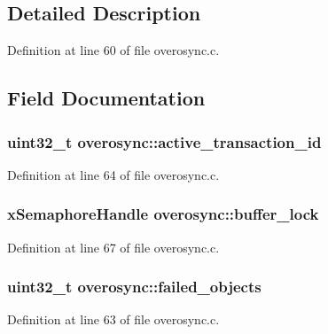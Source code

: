 \subsection{\-Detailed \-Description}


\-Definition at line 60 of file overosync.\-c.



\subsection{\-Field \-Documentation}
\hypertarget{structoverosync_a1d7c514ddaae4ce9d2eb14242df38685}{
\subsubsection[{active\-\_\-transaction\-\_\-id}]{\setlength{\rightskip}{0pt plus 5cm}uint32\-\_\-t {\bf overosync\-::active\-\_\-transaction\-\_\-id}}}\label{structoverosync_a1d7c514ddaae4ce9d2eb14242df38685}


\-Definition at line 64 of file overosync.\-c.

\hypertarget{structoverosync_aa265838f8057c004fdb2e4ef40685434}{
\subsubsection[{buffer\-\_\-lock}]{\setlength{\rightskip}{0pt plus 5cm}x\-Semaphore\-Handle {\bf overosync\-::buffer\-\_\-lock}}}\label{structoverosync_aa265838f8057c004fdb2e4ef40685434}


\-Definition at line 67 of file overosync.\-c.

\hypertarget{structoverosync_aaa5dfd30a46b95fadb58527bc878b2a9}{
\subsubsection[{failed\-\_\-objects}]{\setlength{\rightskip}{0pt plus 5cm}uint32\-\_\-t {\bf overosync\-::failed\-\_\-objects}}}\label{structoverosync_aaa5dfd30a46b95fadb58527bc878b2a9}


\-Definition at line 63 of file overosync.\-c.

